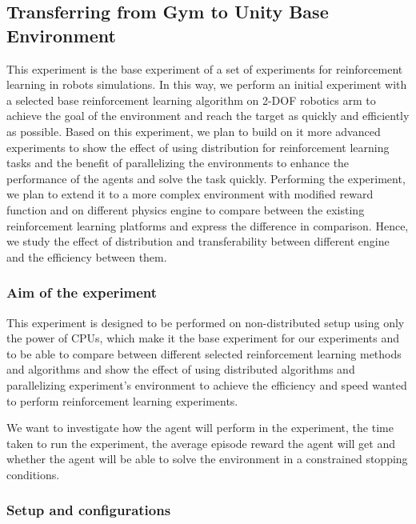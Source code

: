 
\subsection{Transferring from Gym to Unity Base Environment}


This experiment is the base experiment of a set of experiments for reinforcement learning in robots simulations.
In this way, we perform an initial experiment with a selected base reinforcement learning algorithm on 2-DOF robotics arm to achieve the goal of the environment and reach the target as quickly and efficiently as possible.
Based on this experiment, we plan to build on it more advanced experiments to show the effect of using distribution for reinforcement learning tasks and the benefit of parallelizing the environments to enhance the performance of the agents and solve the task quickly. Performing the experiment, we plan to extend it to a more complex environment with modified reward function and on different physics engine to compare between the existing reinforcement learning platforms and express the difference in comparison. Hence, we study the effect of distribution and transferability between different engine and the efficiency between them.

\subsubsection{Aim of the experiment}

This experiment is designed to be performed on non-distributed setup using only the power of CPUs, which make it the base experiment for our experiments and to be able to compare between different selected reinforcement learning methods and algorithms and show the effect of using distributed algorithms and parallelizing experiment's environment to achieve the efficiency and speed wanted to perform reinforcement learning experiments. 

We want to investigate how the agent will perform in the experiment, the time taken to run the experiment, the average episode reward the agent will get and whether the agent will be able to solve the environment in a constrained stopping conditions.

\subsubsection{Setup and configurations}

